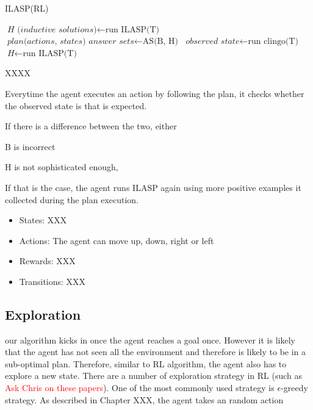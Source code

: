 \begin{algorithm}
\caption{ILASP(RL)}\label{euclid}
\begin{algorithmic}[1]


    \State $\textit{H (inductive solutions)} \gets \text{run ILASP(T)}$
    \State $\textit{plan(actions, states) answer sets} \gets \text{AS(B, H)}$
        \State $\textit{observed state} \gets \text{run clingo(T)}$
            \State $\textit{H} \gets \text{run ILASP(T)}$
            \EndIf
    \EndWhile
\EndWhile

\EndProcedure
\caption{XXXX }
\end{algorithmic}
\end{algorithm}


Everytime the agent executes an action by following the plan, it checks whether the observed state is that is expected. 

If there is a difference between the two, either

B is incorrect

H is not sophisticated enough, 

If that is the case, the agent runs ILASP again using more positive examples it collected during the plan execution. 


\begin{itemize}
\item States: XXX
\item Actions: The agent can move up, down, right or left
\item Rewards: XXX
\item Transitions: XXX
\end{itemize}

\subsection{Exploration}
\label{exploration}

our algorithm kicks in once the agent reaches a goal once. However it is likely that the agent has not seen all the environment
and therefore is likely to be in a sub-optimal plan. Therefore, similar to RL algorithm, the agent also has to explore a new state. 
There are a number of exploration strategy in RL (such as \textcolor{red}{Ask Chris on these papers}). 
One of the most commonly used strategy is $\epsilon$-greedy strategy. As described in Chapter XXX, the agent takes an random action 

